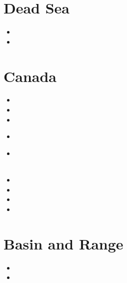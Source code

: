 \section{Dead Sea} 

\begin{scriptsize}
\begin{itemize}
\item[\twothousandfive]
\item[\twothousandeleven]
\end{itemize}
\end{scriptsize}

\section{Canada}

\begin{scriptsize}
\begin{itemize}
\item[\nineteeneighty]
\item[\nineteenninetythree]
\item[\nineteenninetyeight]
\item[\nineteenninetynine]
 \\
\item[\twothousandten]
 \\
 \\
\item[\twothousandthirteen]
\item[\twothousandthirteen]
\item[\twothousandtwenty]
\item[\twothousandtwentythree]
\end{itemize}
\end{scriptsize}

\section{Basin and Range}

\begin{scriptsize}
\begin{itemize}
\item[\nineteeneightynine]
\item[\twothousandnine]
\end{itemize}
\end{scriptsize}


